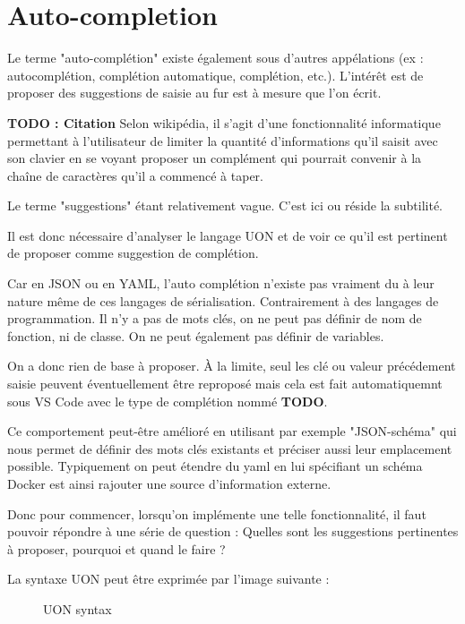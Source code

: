 \documentclass[
    iict, %
    il, %
]{heig-tb}
\begin{document}
\section{Auto-completion}

Le terme "auto-complétion" existe également sous d'autres appélations (ex : autocomplétion, complétion automatique, complétion, etc.).
L'intérêt est de proposer des suggestions de saisie au fur est à mesure que l'on écrit.

\textbf{TODO : Citation}
Selon wikipédia, il s'agit d'une fonctionnalité informatique permettant à l'utilisateur de limiter la quantité d'informations qu'il saisit avec son clavier
en se voyant proposer un complément qui pourrait convenir à la chaîne de caractères qu'il a commencé à taper.

Le terme "suggestions" étant relativement vague. C'est ici ou réside la subtilité.

Il est donc nécessaire d'analyser le langage UON et de voir ce qu'il est pertinent de proposer comme suggestion de complétion.

Car en JSON ou en YAML, l'auto complétion n'existe pas vraiment du à leur nature même de ces langages de sérialisation.
Contrairement à des langages de programmation. Il n'y a pas de mots clés, on ne peut pas définir de nom de fonction, ni de classe. On ne peut également pas définir de variables.

On a donc rien de base à proposer. À la limite, seul les clé ou valeur précédement saisie peuvent éventuellement être reproposé mais cela est fait automatiquemnt sous VS Code
avec le type de complétion nommé \textbf{TODO}.

Ce comportement peut-être amélioré en utilisant par exemple "JSON-schéma" qui nous permet de définir des mots clés existants et préciser aussi leur emplacement possible.
Typiquement on peut étendre du yaml en lui spécifiant un schéma Docker est ainsi rajouter une source d'information externe.

Donc pour commencer, lorsqu'on implémente une telle fonctionnalité, il faut pouvoir répondre à une série de question :
Quelles sont les suggestions pertinentes à proposer, pourquoi et quand le faire ?

La syntaxe UON peut être exprimée par l'image suivante :

\begin{figure}[!ht]
    \begin{center}
    \end{center}
    \caption[syntax]{\label{syntax} UON syntax}
\end{figure}
\end{document}

